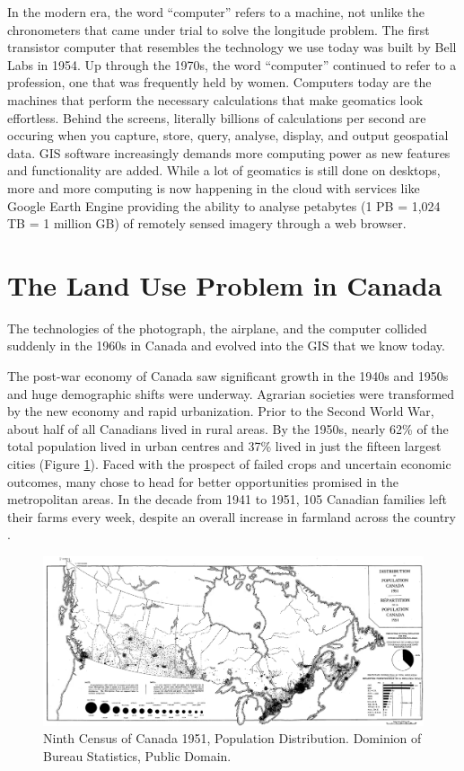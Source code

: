 \documentclass[
]{book}
\begin{document}
In the modern era, the word ``computer'' refers to a machine, not unlike the chronometers that came under trial to solve the longitude problem. The first transistor computer that resembles the technology we use today was built by Bell Labs in 1954. Up through the 1970s, the word ``computer'' continued to refer to a profession, one that was frequently held by women. Computers today are the machines that perform the necessary calculations that make geomatics look effortless. Behind the screens, literally billions of calculations per second are occuring when you capture, store, query, analyse, display, and output geospatial data. GIS software increasingly demands more computing power as new features and functionality are added. While a lot of geomatics is still done on desktops, more and more computing is now happening in the cloud with services like Google Earth Engine providing the ability to analyse petabytes (1 PB = 1,024 TB = 1 million GB) of remotely sensed imagery through a web browser.

\hypertarget{the-land-use-problem-in-canada}{%
\section{The Land Use Problem in Canada}\label{the-land-use-problem-in-canada}}

The technologies of the photograph, the airplane, and the computer collided suddenly in the 1960s in Canada and evolved into the GIS that we know today.

The post-war economy of Canada saw significant growth in the 1940s and 1950s and huge demographic shifts were underway. Agrarian societies were transformed by the new economy and rapid urbanization. Prior to the Second World War, about half of all Canadians lived in rural areas. By the 1950s, nearly 62\% of the total population lived in urban centres and 37\% lived in just the fifteen largest cities (Figure \ref{fig:1-ninth-census-1951-map}). Faced with the prospect of failed crops and uncertain economic outcomes, many chose to head for better opportunities promised in the metropolitan areas. In the decade from 1941 to 1951, 105 Canadian families left their farms every week, despite an overall increase in farmland across the country \citep{dominion_bureau_of_statistics_volume_1944} \citep{dominion_bureau_of_statistics_number_1952}.

\begin{figure}
\includegraphics[width=0.75\linewidth]{images/01-ninth-census-1951-map} \caption{Ninth Census of Canada 1951, Population Distribution. Dominion of Bureau Statistics, Public Domain.}\label{fig:1-ninth-census-1951-map}
\end{figure}
\end{document}
